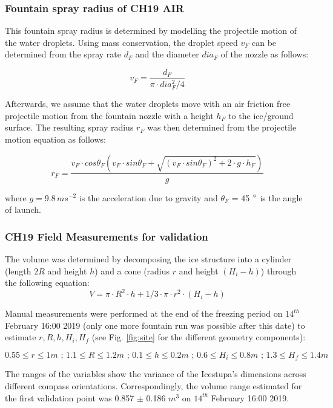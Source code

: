 \documentclass[utf8]{frontiersSCNS} %
\begin{document}
\subsubsection{Fountain spray radius of CH19 AIR} \label{section:sprayCH19} 
This fountain spray radius is determined by modelling the projectile motion of the water droplets. Using mass
conservation, the droplet speed $v_F$ can be determined from the spray rate $d_F$ and the diameter $dia_F$ of the nozzle
as follows:

\begin{equation} v_F = \frac{d_F}{\pi \cdot dia_F^2/4} \end{equation}

Afterwards, we assume that the water droplets move with an air friction free projectile motion from the fountain
nozzle with a height $h_F$ to the ice/ground surface. The resulting spray radius $r_F$ was then determined from the
projectile motion equation as follows:

\begin{equation} r_F = \frac{v_F \cdot cos\theta_F (v_F \cdot sin\theta_F + \sqrt{(v_F \cdot sin\theta_F)^{2} + 2
\cdot g \cdot h_F})}{g} \end{equation}

where $g = 9.8\, m s^{-2}$ is the acceleration due to gravity and $\theta_F$ = 45 $\degree$ is the angle of launch.

\subsubsection{CH19 Field Measurements for validation} \label{section:validation} 
The volume was determined by decomposing the ice structure into a cylinder (length $2R$ and height $h$) and a
cone (radius $r$ and height $(H_i-h)$) through the following equation: 
\begin{equation} V = \pi \cdot R^2 \cdot h + 1/3 \cdot \pi \cdot r^2 \cdot (H_i-h) \end{equation}

Manual measurements were performed at the end of the freezing period on $14^{th}$ February 16:00 2019 (only one more
fountain run was possible after this date) to estimate $r, R, h, H_i, H_f$ (see Fig. \ref{fig:site} for the different
geometry components):

$$ 0.55\leq r\leq 1 m\textit{ ; }1.1\leq R\leq 1.2 m\textit{ ; }0.1\leq h\leq 0.2 m\textit{ ; }0.6\leq
H_i\leq 0.8 m\textit{ ; }1.3\leq H_f\leq 1.4 m  $$

The ranges of the variables show the variance of the Icestupa's dimensions across different compass orientations.
Correspondingly, the volume range estimated for the first validation point was 0.857 $\pm$ 0.186 $m^{3}$ on $14^{th}$
February 16:00 2019.
\end{document}
